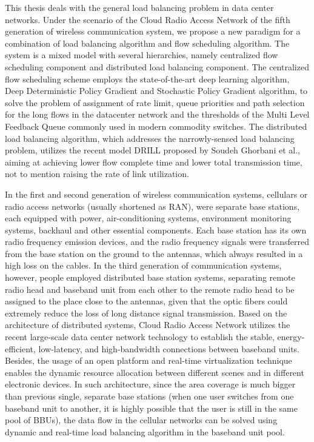 \begin{bigabstract}
This thesis deals with the general load balancing problem in data center networks. Under the scenario of the Cloud Radio Access Network of the fifth generation of wireless communication system, we propose a new paradigm for a combination of load balancing algorithm and flow scheduling algorithm. The system is a mixed model with several hierarchies, namely centralized flow scheduling component and distributed load balancing component. The centralized flow scheduling scheme employs the state-of-the-art deep learning algorithm, Deep Deterministic Policy Gradient and Stochastic Policy Gradient algorithm, to solve the problem of assignment of rate limit, queue priorities and path selection for the long flows in the datacenter network and the thresholds of the Multi Level Feedback Queue commonly used in modern commodity switches. The distributed load balancing algorithm, which addresses the narrowly-sensed load balancing problem, utilizes the recent model DRILL proposed by Soudeh Ghorbani et al., aiming at achieving lower flow complete time and lower total transmission time, not to mention raising the rate of link utilization.

In the first and second generation of wireless communication systems, cellulars or radio access networks (usually shortened as RAN), were separate base stations, each equipped with power, air-conditioning systems, environment monitoring systems, backhaul and other essential components. Each base station has its own radio frequency emission devices, and the radio frequency signals were transferred from the base station on the ground to the antennas, which always resulted in a high loss on the cables. In the third generation of communication systems, however, people employed distributed base station systems, separating remote radio head and baseband unit from each other to the remote radio head to be assigned to the place close to the antennas, given that the optic fibers could extremely reduce the loss of long distance signal transmission. Based on the architecture of distributed systems, Cloud Radio Access Network utilizes the recent large-scale data center network technology to establish the stable, energy-efficient, low-latency, and high-bandwidth connections between baseband units. Besides, the usage of an open platform and real-time virtualization technique enables the dynamic resource allocation between different scenes and in different electronic devices. In such architecture, since the area coverage is much bigger than previous single, separate base stations (when one user switches from one baseband unit to another, it is highly possible that the user is still in the same pool of BBUs), the data flow in the cellular networks can be solved using dynamic and real-time load balancing algorithm in the baseband unit pool.


\end{bigabstract}

